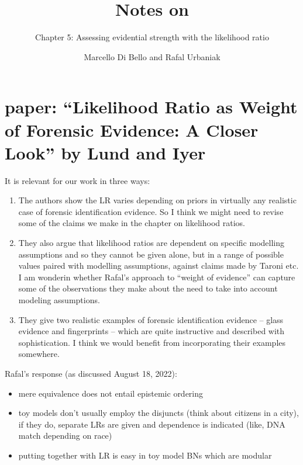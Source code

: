 \documentclass[
  10pt,
  dvipsnames,enabledeprecatedfontcommands]{scrartcl}
\title{Notes on}
\subtitle{Chapter 5: Assessing evidential strength with the likelihood
ratio}
\author{Marcello Di Bello and Rafal Urbaniak}
\date{}
\providecommand{\tightlist}{%
  \setlength{\itemsep}{0pt}\setlength{\parskip}{0pt}}
\begin{document}
\maketitle

\hypertarget{paper-likelihood-ratio-as-weight-of-forensic-evidence-a-closer-look-by-lund-and-iyer}{%
\section{paper: ``Likelihood Ratio as Weight of Forensic Evidence: A
Closer Look'' by Lund and
Iyer}\label{paper-likelihood-ratio-as-weight-of-forensic-evidence-a-closer-look-by-lund-and-iyer}}

It is relevant for our work in three ways:

\begin{enumerate}
\def\labelenumi{\arabic{enumi})}
\item
  The authors show the LR varies depending on priors in virtually any
  realistic case of forensic identification evidence. So I think we
  might need to revise some of the claims we make in the chapter on
  likelihood ratios.
\item
  They also argue that likelihood ratios are dependent on specific
  modelling assumptions and so they cannot be given alone, but in a
  range of possible values paired with modelling assumptions, against
  claims made by Taroni etc. I am wonderin whether Rafal's approach to
  ``weight of evidence'' can capture some of the observations they make
  about the need to take into account modeling assumptions.
\item
  They give two realistic examples of forensic identification evidence
  -- glass evidence and fingerprints -- which are quite instructive and
  described with sophistication. I think we would benefit from
  incorporating their examples somewhere.
\end{enumerate}

Rafal's response (as discussed August 18, 2022):

\begin{itemize}
\tightlist
\item
  mere equivalence does not entail epistemic ordering
\item
  toy models don't usually employ the disjuncts (think about citizens in
  a city), if they do, separate LRs are given and dependence is
  indicated (like, DNA match depending on race)
\item
  putting together with LR is easy in toy model BNs which are modular
\end{itemize}
\end{document}
